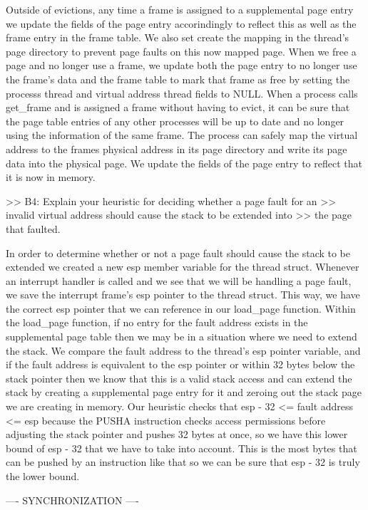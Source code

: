 Outside of evictions, any time a frame is assigned to a supplemental page
entry we update the fields of the page entry accorindingly to reflect this
as well as the frame entry in the frame table. We also set create the mapping
in the thread's page directory to prevent page faults on this now mapped page.
When we free a page and no longer use a frame, we update both the page entry
to no longer use the frame's data and the frame table to mark that frame as 
free by setting the processs thread and virtual address thread fields to NULL.
When a process calls get_frame and is assigned a frame without having to evict,
it can be sure that the page table entries of any other processes will be 
up to date and no longer using the information of the same frame. The process
can safely map the virtual address to the frames physical address in its page
directory and write its page data into the physical page. We update the fields
of the page entry to reflect that it is now in memory.

>> B4: Explain your heuristic for deciding whether a page fault for an
>> invalid virtual address should cause the stack to be extended into
>> the page that faulted.

In order to determine whether or not a page fault should cause the stack
to be extended we created a new esp member variable for the thread struct.
Whenever an interrupt handler is called and we see that we will be handling
a page fault, we save the interrupt frame's esp pointer to the thread struct.
This way, we have the correct esp pointer that we can reference in our
load_page function. Within the load_page function, if no entry for the fault
address exists in the supplemental page table then we may be in a situation
where we need to extend the stack. We compare the fault address to the
thread's esp pointer variable, and if the fault address is equivalent to the
esp pointer or within 32 bytes below the stack pointer then we know that this
is a valid stack access and can extend the stack by creating a supplemental
page entry for it and zeroing out the stack page we are creating in memory.
Our heuristic checks that esp - 32 <= fault address <= esp because the 
PUSHA instruction checks access permissions before adjusting the stack pointer
and pushes 32 bytes at once, so we have this lower bound of esp - 32 that
we have to take into account. This is the most bytes that can be pushed by an
instruction like that so we can be sure that esp - 32 is truly the lower bound.


---- SYNCHRONIZATION ----

